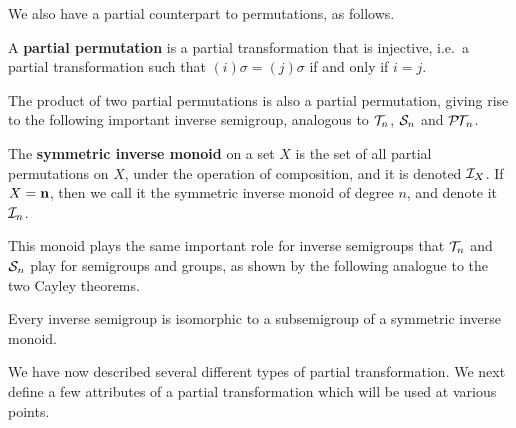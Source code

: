 We also have a partial counterpart to permutations, as follows.

\begin{definition}
  \label{def:partial-perm}
  A \textbf{partial permutation} is a partial transformation that is injective,
  i.e.~a partial transformation such that $(i)\sigma=(j)\sigma$ if and only if
  $i=j$.
\end{definition}

The product of two partial permutations is also a partial permutation, giving
rise to the following important inverse semigroup, analogous to $\mathcal{T}_n$, $\mathcal{S}_n$
and $\mathcal{P\!T\!}_n$.

\begin{definition}
  \label{def:in}
  The \textbf{symmetric inverse monoid} on a set $X$ is the set of all partial
  permutations on $X$, under the operation of composition, and it is denoted
  $\mathcal{I}_X$.  If $X = \mathbf{n}$, then we call it the symmetric inverse monoid of degree
  $n$, and denote it $\mathcal{I}_n$.
\end{definition}

This monoid plays the same important role for inverse semigroups that $\mathcal{T}_n$ and
$\mathcal{S}_n$ play for semigroups and groups, as shown by the following analogue to
the two Cayley theorems.

\begin{theorem}
  \label{thm:wagner-preston}
  Every inverse semigroup is isomorphic to a subsemigroup of a symmetric inverse
  monoid.
\end{theorem}

We have now described several different types of partial transformation.  We
next define a few attributes of a partial transformation which will be used at
various points.

